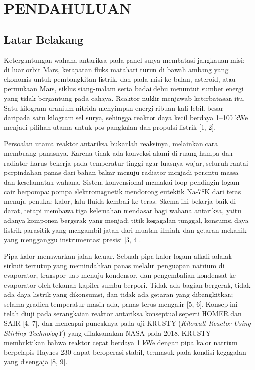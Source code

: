 \documentclass[
  indonesian,
  12pt,
  a4paper,
]{report}
\begin{document}
\setcounter{page}{1}

\chapter{PENDAHULUAN}\label{pendahuluan}

\section{Latar Belakang}\label{latar-belakang}

Ketergantungan wahana antariksa pada panel surya membatasi jangkauan
misi: di luar orbit Mars, kerapatan fluks matahari turun di bawah ambang
yang ekonomis untuk pembangkitan listrik, dan pada misi ke bulan,
asteroid, atau permukaan Mars, siklus siang-malam serta badai debu
menuntut sumber energi yang tidak bergantung pada cahaya. Reaktor nuklir
menjawab keterbatasan itu. Satu kilogram uranium nitrida menyimpan
energi ribuan kali lebih besar daripada satu kilogram sel surya,
sehingga reaktor daya kecil berdaya 1--100 kWe menjadi pilihan utama
untuk pos pangkalan dan propulsi listrik {[}1, 2{]}.

Persoalan utama reaktor antariksa bukanlah reaksinya, melainkan cara
membuang panasnya. Karena tidak ada konveksi alami di ruang hampa dan
radiator harus bekerja pada temperatur tinggi agar luasnya wajar,
seluruh rantai perpindahan panas dari bahan bakar menuju radiator
menjadi penentu massa dan keselamatan wahana. Sistem konvensional
memakai loop pendingin logam cair berpompa: pompa elektromagnetik
mendorong eutektik Na-78K dari teras menuju penukar kalor, lalu fluida
kembali ke teras. Skema ini bekerja baik di darat, tetapi membawa tiga
kelemahan mendasar bagi wahana antariksa, yaitu adanya komponen bergerak
yang menjadi titik kegagalan tunggal, konsumsi daya listrik parasitik
yang mengambil jatah dari muatan ilmiah, dan getaran mekanik yang
mengganggu instrumentasi presisi {[}3, 4{]}.

Pipa kalor menawarkan jalan keluar. Sebuah pipa kalor logam alkali
adalah sirkuit tertutup yang memindahkan panas melalui penguapan natrium
di evaporator, transpor uap menuju kondensor, dan pengembalian kondensat
ke evaporator oleh tekanan kapiler sumbu berpori. Tidak ada bagian
bergerak, tidak ada daya listrik yang dikonsumsi, dan tidak ada getaran
yang dibangkitkan; selama gradien temperatur masih ada, panas terus
mengalir {[}5, 6{]}. Konsep ini telah diuji pada serangkaian reaktor
antariksa konseptual seperti HOMER dan SAIR {[}4, 7{]}, dan mencapai
puncaknya pada uji KRUSTY (\emph{Kilowatt Reactor Using Stirling
TechnologY}) yang dilaksanakan NASA pada 2018. KRUSTY membuktikan bahwa
reaktor cepat berdaya 1 kWe dengan pipa kalor natrium berpelapis Haynes
230 dapat beroperasi stabil, termasuk pada kondisi kegagalan yang
disengaja {[}8, 9{]}.
\end{document}
